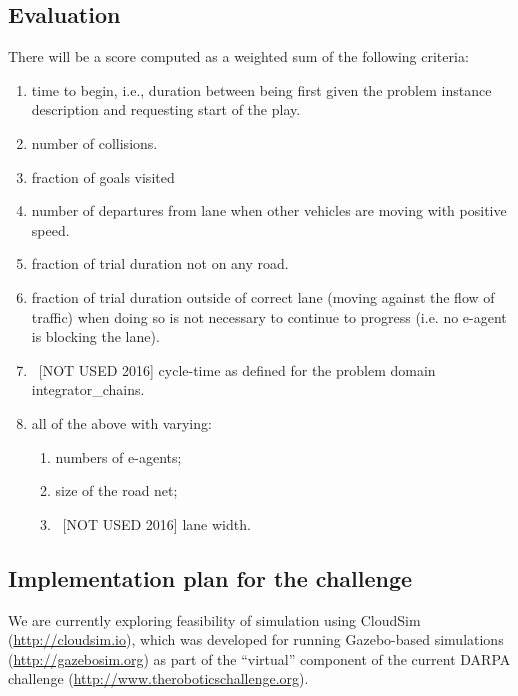 \documentclass{amsart}
\theoremstyle{definition}
\begin{document}
\subsection{Evaluation}
There will be a score computed as a weighted sum of the following criteria:

\begin{enumerate}

\item time to begin, i.e., duration between being first given the problem
instance description and requesting start of the play.

\item number of collisions.

\item fraction of goals visited

\item number of departures from lane when other vehicles are moving with
positive speed.

\item fraction of trial duration not on any road.

\item fraction of trial duration outside of correct lane (moving against the flow of traffic)
 when doing so is not necessary to continue to progress (i.e. no e-agent is blocking
 the lane).

\item~[NOT USED 2016] cycle-time as defined for the problem domain
integrator\_chains.

\item all of the above with varying:
\begin{enumerate}
  \item numbers of e-agents;
  \item size of the road net;
  \item~[NOT USED 2016] lane width.
\end{enumerate}
 
\end{enumerate}

\subsection{Implementation plan for the challenge}

We are currently exploring feasibility of simulation using CloudSim
(\url{http://cloudsim.io}), which was developed for running Gazebo-based
simulations (\url{http://gazebosim.org}) as part of the ``virtual'' component of
the current DARPA challenge (\url{http://www.theroboticschallenge.org}).
\end{document}
